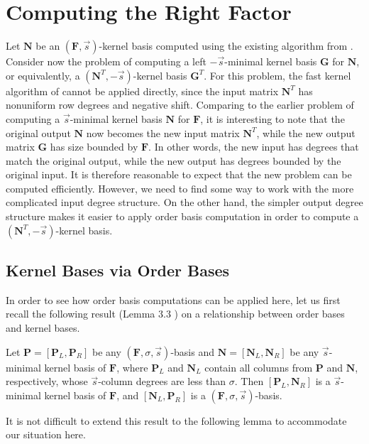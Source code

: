 
\section{\label{sec:computeRightFactor}Computing the Right Factor}

Let $\mathbf{N}$ be an $\left(\mathbf{F},\vec{s}\right)$-kernel
basis computed using the existing algorithm from \cite{za2012}. Consider
now the problem of computing a left $-\vec{s}$-minimal kernel basis
$\mathbf{G}$ for $\mathbf{N}$, or equivalently, a $\left(\mathbf{N}^{T},-\vec{s}\right)$-kernel
basis $\mathbf{G}^{T}$. For this problem, the fast kernel algorithm
of \cite{za2012} cannot be applied directly, since the input matrix
$\mathbf{N}^{T}$ has nonuniform row degrees and negative shift. Comparing
to the earlier problem of computing a $\vec{s}$-minimal kernel basis
$\mathbf{N}$ for $\mathbf{F}$, it is interesting to note that the
original output $\mathbf{N}$ now becomes the new input matrix $\mathbf{N}^{T}$,
while the new output matrix $\mathbf{G}$ has size bounded by $\mathbf{F}$.
In other words, the new input has degrees that match the original
output, while the new output has degrees bounded by the original input.
It is therefore reasonable to expect that the new problem can be computed
efficiently. However, we need to find some way to work with the more
complicated input degree structure. On the other hand, the simpler
output degree structure makes it easier to apply order basis computation
in order to compute a $\left(\mathbf{N}^{T},-\vec{s}\right)$-kernel
basis.


\subsection{Kernel Bases via Order Bases}

In order to see how order basis computations can be applied here,
let us first recall the following result (Lemma 3.3 \cite{za2012})
on a relationship between order bases and kernel bases.
\begin{lem}
\label{lem:orderBasisContainsNullspaceBasis}Let $\mathbf{P}=\left[\mathbf{P}_{L},\mathbf{P}_{R}\right]$
be any $\left(\mathbf{F},\sigma,\vec{s}\right)$-basis and $\mathbf{N}=\left[\mathbf{N}_{L},\mathbf{N}_{R}\right]$
be any $\vec{s}$-minimal kernel basis of $\mathbf{F}$, where $\mathbf{P}_{L}$
and $\mathbf{N}_{L}$ contain all columns from $\mathbf{P}$ and $\mathbf{N}$,
respectively, whose $\vec{s}$-column degrees are less than $\sigma$.
Then $\left[\mathbf{P}_{L},\mathbf{N}_{R}\right]$ is a $\vec{s}$-minimal
kernel basis of $\mathbf{F}$, and $\left[\mathbf{N}_{L},\mathbf{P}_{R}\right]$
is a $\left(\mathbf{F},\sigma,\vec{s}\right)$-basis.
\end{lem}
It is not difficult to extend this result to the following lemma to
accommodate our situation here.%
\begin{comment}
 For the remainder of this paper an integer vector of ones is denoted
by $\vec{e}$. 
\end{comment}

